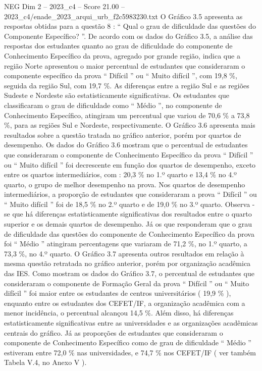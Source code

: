\begin{textsample}{NEG Dim 2 – 2023\_c4 – Score 21.00 – 2023\_c4/enade\_2023\_arqui\_urb\_f2c5983230.txt}
O Gráfico 3.5 apresenta as respostas obtidas para a questão 8 : “ Qual o grau de dificuldade das questões do Componente Específico? ”.
De acordo com os dados do Gráfico 3.5, a análise das respostas dos estudantes quanto ao grau de dificuldade do componente de Conhecimento Específico da prova, agregado por grande região, indica que a região Norte apresentou o maior percentual de estudantes que consideraram o componente específico da prova “ Difícil ” ou “ Muito difícil ”, com 19,8 \%, seguida da região Sul, com 19,7 \%.
As diferenças entre a região Sul e as regiões Sudeste e Nordeste são estatisticamente significativas.
Os estudantes que classificaram o grau de dificuldade como “ Médio ”, no componente de Conhecimento Específico, atingiram um percentual que variou de 70,6 \% a 73,8 \%, para as regiões Sul e Nordeste, respectivamente.
O Gráfico 3.6 apresenta mais resultados sobre a questão tratada no gráfico anterior, porém por quartos de desempenho.
Os dados do Gráfico 3.6 mostram que o percentual de estudantes que consideraram o componente de Conhecimento Específico da prova “ Difícil ” ou “ Muito difícil ” foi decrescente em função dos quartos de desempenho, exceto entre os quartos intermediários, com : 20,3 \% no 1.º quarto e 13,4 \% no 4.º quarto, o grupo de melhor desempenho na prova.
Nos quartos de desempenho intermediários, a proporção de estudantes que consideraram a prova “ Difícil ” ou “ Muito difícil ” foi de 18,5 \% no 2.º quarto e de 19,0 \% no 3.º quarto.
Observa -se que há diferenças estatisticamente significativas dos resultados entre o quarto superior e os demais quartos de desempenho.
Já os que responderam que o grau de dificuldade das questões do componente de Conhecimento Específico da prova foi “ Médio ” atingiram percentagens que variaram de 71,2 \%, no 1.º quarto, a 73,3 \%, no 4.º quarto.
O Gráfico 3.7 apresenta outros resultados em relação à mesma questão retratada no gráfico anterior, porém por organização acadêmica das IES.
Como mostram os dados do Gráfico 3.7, o percentual de estudantes que consideraram o componente de Formação Geral da prova “ Difícil ” ou “ Muito difícil ” foi maior entre os estudantes de centros universitários ( 19,9 \% ), enquanto entre os estudantes dos CEFET/IF, a organização acadêmica com a menor incidência, o percentual alcançou 14,5 \%.
Além disso, há diferenças estatisticamente significativas entre as universidades e as organizações acadêmicas centrais do gráfico.
Já as proporções de estudantes que consideraram o componente de Conhecimento Específico como de grau de dificuldade “ Médio ” estiveram entre 72,0 \% nas universidades, e 74,7 \% nos CEFET/IF ( ver também Tabela V.4, no Anexo V ).

\end{textsample}
